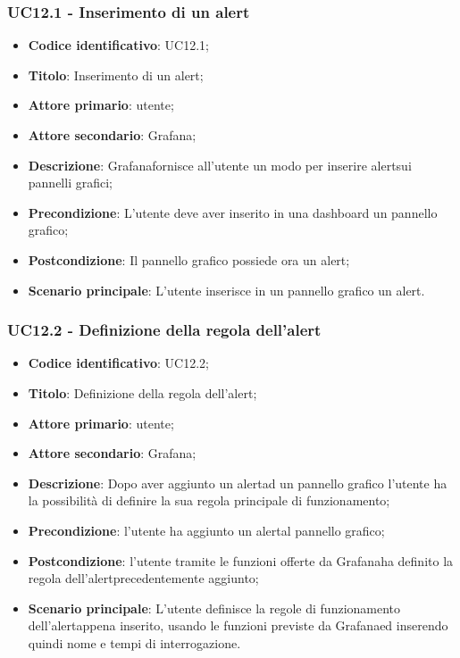 \subsubsection{UC12.1 - Inserimento di un alert}
\begin{itemize}
	\item \textbf{Codice identificativo}: UC12.1;
	\item \textbf{Titolo}: Inserimento di un alert\glo;
	\item \textbf{Attore primario}: utente;
	\item \textbf{Attore secondario}: Grafana\glo;
	\item \textbf{Descrizione}: Grafana\glosp fornisce all'utente un modo per inserire alert\glosp sui pannelli grafici;
	\item \textbf{Precondizione}: L'utente deve aver inserito in una dashboard un pannello grafico;
	\item \textbf{Postcondizione}: Il pannello grafico possiede ora un alert\glo;
	\item \textbf{Scenario principale}: L'utente inserisce in un pannello grafico un alert\glo.
\end{itemize}

\subsubsection{UC12.2 - Definizione della regola dell'alert}
\begin{itemize}
	\item \textbf{Codice identificativo}: UC12.2;
	\item \textbf{Titolo}: Definizione della regola dell'alert\glo;
	\item \textbf{Attore primario}: utente;
	\item \textbf{Attore secondario}: Grafana\glo;
	\item \textbf{Descrizione}: Dopo aver aggiunto un alert\glosp ad un pannello grafico l'utente ha la possibilità di definire la sua regola principale di funzionamento;
	\item \textbf{Precondizione}: l'utente ha aggiunto un alert\glosp al pannello grafico;
	\item \textbf{Postcondizione}: l'utente tramite le funzioni offerte da Grafana\glosp ha definito la regola dell'alert\glosp precedentemente aggiunto;
	\item \textbf{Scenario principale}: L'utente definisce la regole di funzionamento dell'alert\glosp appena inserito, usando le funzioni previste da Grafana\glosp ed inserendo quindi nome e tempi di interrogazione.
\end{itemize}

